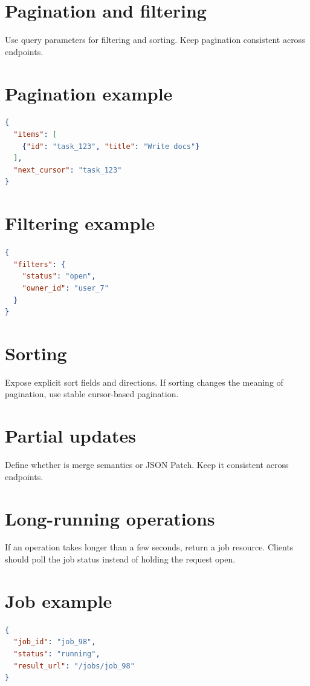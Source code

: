 \section{Pagination and filtering}
Use query parameters for filtering and sorting.
Keep pagination consistent across endpoints.

\section{Pagination example}
\begin{lstlisting}[language=JSON]
{
  "items": [
    {"id": "task_123", "title": "Write docs"}
  ],
  "next_cursor": "task_123"
}
\end{lstlisting}

\section{Filtering example}
\begin{lstlisting}[language=JSON]
{
  "filters": {
    "status": "open",
    "owner_id": "user_7"
  }
}
\end{lstlisting}

\section{Sorting}
Expose explicit sort fields and directions.
If sorting changes the meaning of pagination, use stable cursor-based pagination.

\section{Partial updates}
Define whether  is merge semantics or JSON Patch.
Keep it consistent across endpoints.

\section{Long-running operations}
If an operation takes longer than a few seconds, return a job resource.
Clients should poll the job status instead of holding the request open.

\section{Job example}
\begin{lstlisting}[language=JSON]
{
  "job_id": "job_98",
  "status": "running",
  "result_url": "/jobs/job_98"
}
\end{lstlisting}

